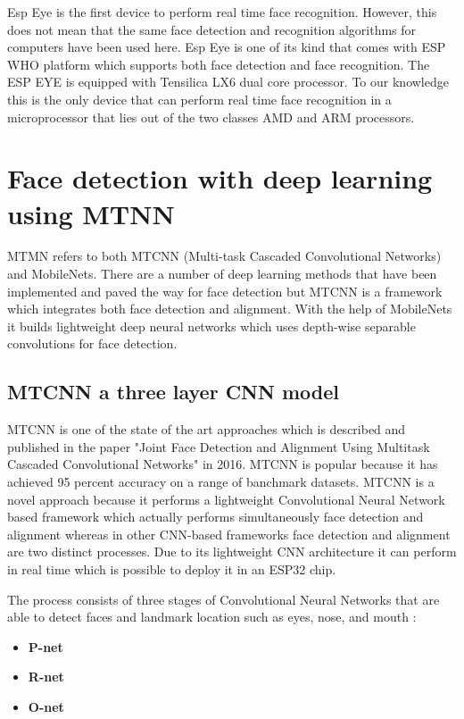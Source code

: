 Esp Eye is the first device to perform real time face recognition. However, this does not mean that the same face detection and recognition algorithms for computers have been used here. Esp Eye is one of its kind that comes with ESP WHO \cite{esp-who} platform which supports both face detection and face recognition. The ESP EYE \cite{espeye} is equipped with Tensilica LX6 dual core processor. To our knowledge this is the only device that can perform real time face recognition in a microprocessor that lies out of the two classes AMD and ARM processors. 

\section{Face detection with deep learning using MTNN}

MTMN refers to both MTCNN (Multi-task Cascaded Convolutional Networks) and MobileNets. There are a number of deep learning methods that have been implemented and paved the way for face detection but MTCNN is a framework which integrates both face detection and alignment. With the help of MobileNets it builds lightweight deep neural networks which uses depth-wise separable convolutions for face detection.


\subsection{MTCNN a three layer CNN model}

MTCNN is one of the state of the art approaches which is described and published in the paper "Joint Face Detection and Alignment Using Multitask Cascaded Convolutional Networks" \cite{refmtcnn} in 2016. MTCNN is popular because it has achieved 95 percent accuracy on a range of banchmark datasets. MTCNN is a novel approach because it performs a lightweight Convolutional Neural Network based framework which actually performs simultaneously face detection and alignment whereas in other CNN-based frameworks face detection and alignment are two distinct processes.   
Due to its lightweight CNN architecture it can perform in real time which is possible to deploy it in an ESP32 chip. 

The process consists of three stages of Convolutional Neural Networks that are able to detect faces and landmark location such as eyes, nose, and mouth : 

\begin{itemize}
    \item \textbf{P-net} 
    \item \textbf{R-net} 
    \item \textbf{O-net} 
\end{itemize}


